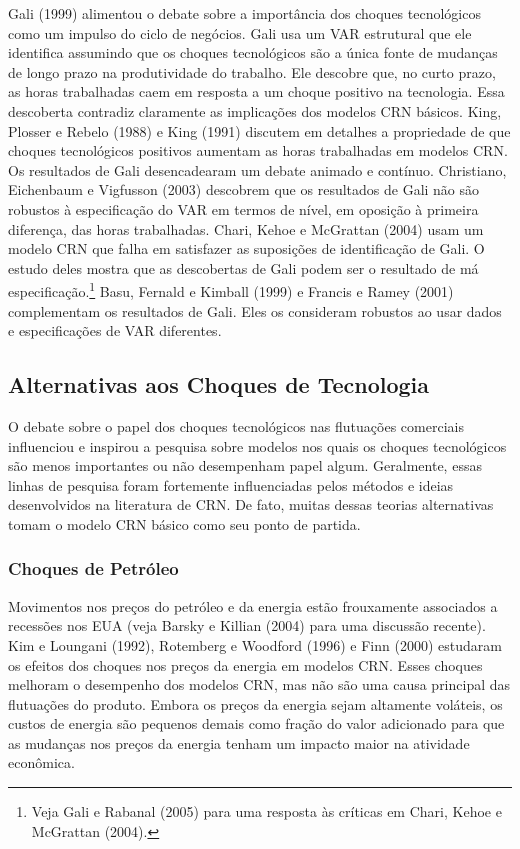 \documentclass[12pt]{article}
\begin{document}
Gali (1999) alimentou o debate sobre a importância dos choques tecnológicos como um impulso do ciclo de negócios. Gali usa um VAR estrutural que ele identifica assumindo que os choques tecnológicos são a única fonte de mudanças de longo prazo na produtividade do trabalho. Ele descobre que, no curto prazo, as horas trabalhadas caem em resposta a um choque positivo na tecnologia. Essa descoberta contradiz claramente as implicações dos modelos CRN básicos. King, Plosser e Rebelo (1988) e King (1991) discutem em detalhes a propriedade de que choques tecnológicos positivos aumentam as horas trabalhadas em modelos CRN. Os resultados de Gali desencadearam um debate animado e contínuo. Christiano, Eichenbaum e Vigfusson (2003) descobrem que os resultados de Gali não são robustos à especificação do VAR em termos de nível, em oposição à primeira diferença, das horas trabalhadas. Chari, Kehoe e McGrattan (2004) usam um modelo CRN que falha em satisfazer as suposições de identificação de Gali. O estudo deles mostra que as descobertas de Gali podem ser o resultado de má especificação.\footnote{Veja Gali e Rabanal (2005) para uma resposta às críticas em Chari, Kehoe e McGrattan (2004).} Basu, Fernald e Kimball (1999) e Francis e Ramey (2001) complementam os resultados de Gali. Eles os consideram robustos ao usar dados e especificações de VAR diferentes.

\subsection*{Alternativas aos Choques de Tecnologia}

O debate sobre o papel dos choques tecnológicos nas flutuações comerciais influenciou e inspirou a pesquisa sobre modelos nos quais os choques tecnológicos são menos importantes ou não desempenham papel algum. Geralmente, essas linhas de pesquisa foram fortemente influenciadas pelos métodos e ideias desenvolvidos na literatura de CRN. De fato, muitas dessas teorias alternativas tomam o modelo CRN básico como seu ponto de partida.

\subsubsection*{Choques de Petróleo}

Movimentos nos preços do petróleo e da energia estão frouxamente associados a recessões nos EUA (veja Barsky e Killian (2004) para uma discussão recente). Kim e Loungani (1992), Rotemberg e Woodford (1996) e Finn (2000) estudaram os efeitos dos choques nos preços da energia em modelos CRN. Esses choques melhoram o desempenho dos modelos CRN, mas não são uma causa principal das flutuações do produto. Embora os preços da energia sejam altamente voláteis, os custos de energia são pequenos demais como fração do valor adicionado para que as mudanças nos preços da energia tenham um impacto maior na atividade econômica.
\end{document}
